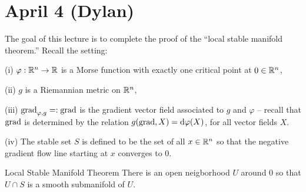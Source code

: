 \section*{\textbf{April 4 (Dylan)}}
The goal of this lecture is to complete the proof of the ``local stable manifold theorem.'' Recall the setting:

(i) $\varphi:\mathbb{R}^{n}\to \mathbb{R}$ is a Morse function with exactly one critical point at $0\in \mathbb{R}^{n}$,

(ii) $g$ is a Riemannian metric on $\mathbb{R}^{n}$,

(iii) $\mathrm{grad}_{\varphi,g}=:\mathrm{grad}$ is the gradient vector field associated to $g$ and $\varphi$ -- recall that $\mathrm{grad}$ is determined by the relation $g(\mathrm{grad},X)=\mathrm{d}\varphi(X)$, for all vector fields $X$.

(iv) The stable set $S$ is defined to be the set of all $x\in \mathbb{R}^{n}$ so that the negative gradient flow line starting at $x$ converges to $0$.

\begin{clear}{Local Stable Manifold Theorem}
  There is an open neigborhood $U$ around $0$ so that $U\cap S$ is a smooth submanifold of $U$.
\end{clear}


